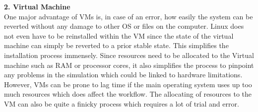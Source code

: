\documentclass[plainarticle,zihtitle,english,final,hyperref,utf8]{zihpub}
\begin{document}
\textbf{2. Virtual Machine}\\
One major advantage of VMs is, in case of an error, how easily the system can be reverted without any damage to other OS or files on the computer. Linux does not even have to be reinstalled within the VM since the state of the virtual machine can simply be reverted to a prior stable state. This simplifies the installation process immensely. Since resources need to be allocated to the Virtual machine such as RAM or processor cores, it also simplifies the process to pinpoint any problems in the simulation which could be linked to hardware limitations.\\
\newline
However, VMs can be prone to lag time if the main operating system uses up too much resources which does affect the workflow. The allocating of resources to the VM can also be quite a finicky process which requires a lot of trial and error.\\
\end{document}
